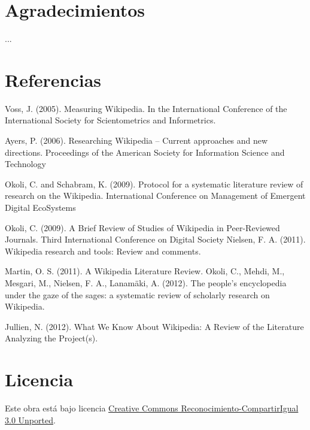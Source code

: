 \documentclass[twoside]{article}
\begin{document}
\begin{multicols}{2}
\section{Agradecimientos}
...

\section{Referencias}
Voss, J. (2005). Measuring Wikipedia. In the International Conference of the International Society for Scientometrics and Informetrics.

Ayers, P. (2006). Researching Wikipedia -- Current approaches and new directions. Proceedings of the American Society for Information Science and Technology

Okoli, C. and Schabram, K. (2009). Protocol for a systematic literature review of research on the Wikipedia. International Conference on Management of Emergent Digital EcoSystems

Okoli, C. (2009). A Brief Review of Studies of Wikipedia in Peer-Reviewed Journals. Third International Conference on Digital Society
Nielsen, F. A. (2011). Wikipedia research and tools: Review and comments.

Martin, O. S. (2011). A Wikipedia Literature Review.
Okoli, C., Mehdi, M., Mesgari, M., Nielsen, F. A.,  Lanam\"{a}ki, A. (2012). The people's encyclopedia under the gaze of the sages: a systematic review of scholarly research on Wikipedia.

Jullien, N. (2012). What We Know About Wikipedia: A Review of the Literature Analyzing the Project(s).

\section{Licencia}
Este obra est\'{a} bajo licencia \href{http://creativecommons.org/licenses/by-sa/3.0/}{Creative Commons Reconocimiento-CompartirIgual 3.0 Unported}.

\end{multicols}
\end{document}
